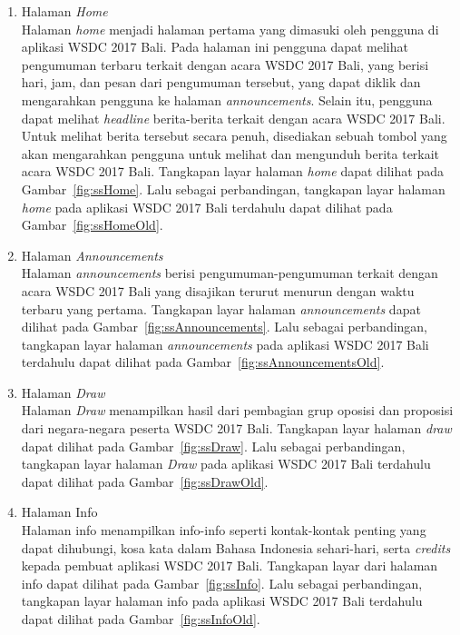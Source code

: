 \begin{enumerate}
	\item Halaman \textit{Home} \\
		Halaman \textit{home} menjadi halaman pertama yang dimasuki oleh pengguna di aplikasi WSDC 2017 Bali. Pada halaman ini pengguna dapat melihat pengumuman terbaru terkait dengan acara WSDC 2017 Bali, yang berisi hari, jam, dan pesan dari pengumuman tersebut, yang dapat diklik dan mengarahkan pengguna ke halaman \textit{announcements}. Selain itu, pengguna dapat melihat \textit{headline} berita-berita terkait dengan acara WSDC 2017 Bali. Untuk melihat berita tersebut secara penuh, disediakan sebuah tombol yang akan mengarahkan pengguna untuk melihat dan mengunduh berita terkait acara WSDC 2017 Bali. Tangkapan layar halaman \textit{home} dapat dilihat pada Gambar~\ref{fig:ssHome}. Lalu sebagai perbandingan, tangkapan layar halaman \textit{home} pada aplikasi WSDC 2017 Bali terdahulu dapat dilihat pada Gambar~\ref{fig:ssHomeOld}.
		
\newpage		
		
	\item Halaman \textit{Announcements} \\
		Halaman \textit{announcements} berisi pengumuman-pengumuman terkait dengan acara WSDC 2017 Bali yang disajikan terurut menurun dengan waktu terbaru yang pertama. Tangkapan layar halaman \textit{announcements} dapat dilihat pada Gambar~\ref{fig:ssAnnouncements}. Lalu sebagai perbandingan, tangkapan layar halaman \textit{announcements} pada aplikasi WSDC 2017 Bali terdahulu dapat dilihat pada Gambar~\ref{fig:ssAnnouncementsOld}.
	
	\item Halaman \textit{Draw} \\
		Halaman \textit{Draw} menampilkan hasil dari pembagian grup oposisi dan proposisi dari negara-negara peserta WSDC 2017 Bali. Tangkapan layar halaman \textit{draw} dapat dilihat pada Gambar~\ref{fig:ssDraw}. Lalu sebagai perbandingan, tangkapan layar halaman \textit{Draw} pada aplikasi WSDC 2017 Bali terdahulu dapat dilihat pada Gambar~\ref{fig:ssDrawOld}.
		
	\item Halaman Info \\
		Halaman info menampilkan info-info seperti kontak-kontak penting yang dapat dihubungi, kosa kata dalam Bahasa Indonesia sehari-hari, serta {\it credits} kepada pembuat aplikasi WSDC 2017 Bali. Tangkapan layar dari halaman info dapat dilihat pada Gambar~\ref{fig:ssInfo}. Lalu sebagai perbandingan, tangkapan layar halaman info pada aplikasi WSDC 2017 Bali terdahulu dapat dilihat pada Gambar~\ref{fig:ssInfoOld}.
		

\end{enumerate}
